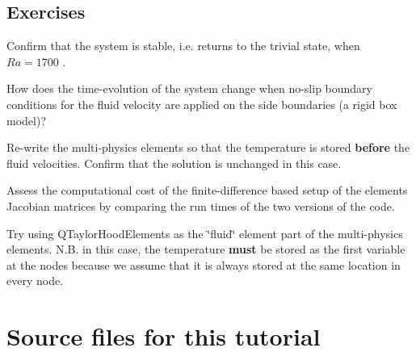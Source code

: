 \hypertarget{index_exercises}{}\subsection{Exercises}\label{index_exercises}

\begin{DoxyEnumerate}
\item Confirm that the system is stable, i.\+e. returns to the trivial state, when $ Ra = 1700 $ .
\item How does the time-\/evolution of the system change when no-\/slip boundary conditions for the fluid velocity are applied on the side boundaries (a rigid box model)?
\item Re-\/write the multi-\/physics elements so that the temperature is stored {\bfseries before} the fluid velocities. Confirm that the solution is unchanged in this case.
\item Assess the computational cost of the finite-\/difference based setup of the elements\textquotesingle{} Jacobian matrices by comparing the run times of the two versions of the code.
\item Try using {\ttfamily Q\+Taylor\+Hood\+Elements} as the \char`\"{}fluid\char`\"{} element part of the multi-\/physics elements. N.\+B. in this case, the temperature {\bfseries must} be stored as the first variable at the nodes because we assume that it is always stored at the same location in every node.
\end{DoxyEnumerate}

 

\hypertarget{index_sources}{}\section{Source files for this tutorial}\label{index_sources}


